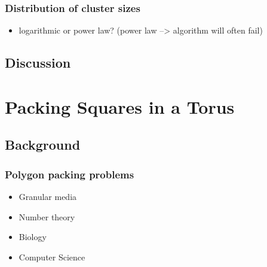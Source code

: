 \documentclass[11pt]{article}
\begin{document}
\subsubsection{Distribution of cluster sizes}
\label{sec-5.5.3}

\begin{itemize}

\item logarithmic or power law? (power law --> algorithm will often fail)\\
\label{sec-5.5.3.1}




\end{itemize} %
\subsection{Discussion}
\label{sec-5.6}

\section{Packing Squares in a Torus}
\label{sec-6}

\subsection{Background}
\label{sec-6.1}

\subsubsection{Polygon packing problems}
\label{sec-6.1.1}

\begin{itemize}

\item Granular media\\
\label{sec-6.1.1.1}


\item Number theory\\
\label{sec-6.1.1.2}


\item Biology\\
\label{sec-6.1.1.3}


\item Computer Science\\
\label{sec-6.1.1.4}

\end{itemize} %
\end{document}
